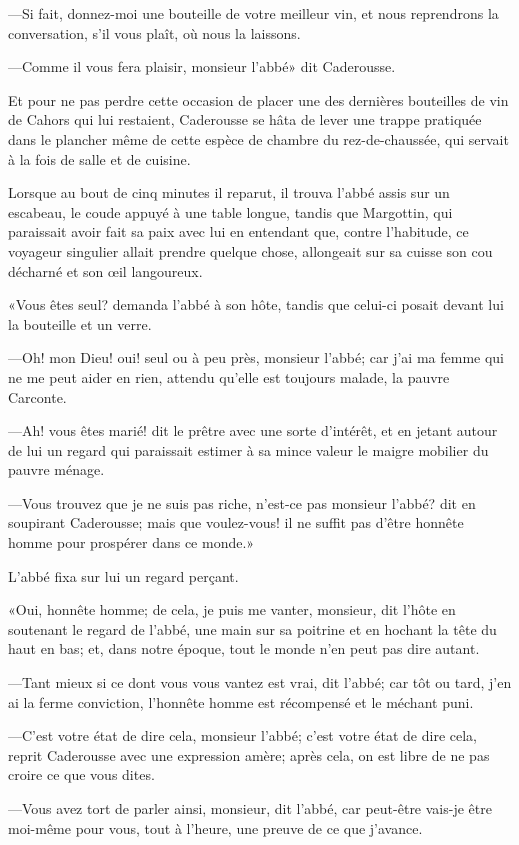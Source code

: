 —Si fait, donnez-moi une bouteille de votre meilleur vin, et nous reprendrons la conversation, s'il vous plaît, où nous la laissons.

—Comme il vous fera plaisir, monsieur l'abbé» dit Caderousse.

Et pour ne pas perdre cette occasion de placer une des dernières bouteilles de vin de Cahors qui lui restaient, Caderousse se hâta de lever une trappe pratiquée dans le plancher même de cette espèce de chambre du rez-de-chaussée, qui servait à la fois de salle et de cuisine.

Lorsque au bout de cinq minutes il reparut, il trouva l'abbé assis sur un escabeau, le coude appuyé à une table longue, tandis que Margottin, qui paraissait avoir fait sa paix avec lui en entendant que, contre l'habitude, ce voyageur singulier allait prendre quelque chose, allongeait sur sa cuisse son cou décharné et son œil langoureux.

«Vous êtes seul? demanda l'abbé à son hôte, tandis que celui-ci posait devant lui la bouteille et un verre.

—Oh! mon Dieu! oui! seul ou à peu près, monsieur l'abbé; car j'ai ma femme qui ne me peut aider en rien, attendu qu'elle est toujours malade, la pauvre Carconte.

—Ah! vous êtes marié! dit le prêtre avec une sorte d'intérêt, et en jetant autour de lui un regard qui paraissait estimer à sa mince valeur le maigre mobilier du pauvre ménage.

—Vous trouvez que je ne suis pas riche, n'est-ce pas monsieur l'abbé? dit en soupirant Caderousse; mais que voulez-vous! il ne suffit pas d'être honnête homme pour prospérer dans ce monde.»

L'abbé fixa sur lui un regard perçant.

«Oui, honnête homme; de cela, je puis me vanter, monsieur, dit l'hôte en soutenant le regard de l'abbé, une main sur sa poitrine et en hochant la tête du haut en bas; et, dans notre époque, tout le monde n'en peut pas dire autant.

—Tant mieux si ce dont vous vous vantez est vrai, dit l'abbé; car tôt ou tard, j'en ai la ferme conviction, l'honnête homme est récompensé et le méchant puni.

—C'est votre état de dire cela, monsieur l'abbé; c'est votre état de dire cela, reprit Caderousse avec une expression amère; après cela, on est libre de ne pas croire ce que vous dites.

—Vous avez tort de parler ainsi, monsieur, dit l'abbé, car peut-être vais-je être moi-même pour vous, tout à l'heure, une preuve de ce que j'avance.

